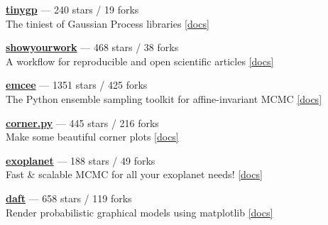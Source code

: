 \item \href{https://github.com/dfm/tinygp}{{\bf tinygp}} --- 240 stars / 19 forks \\
The tiniest of Gaussian Process libraries \href{https://tinygp.readthedocs.io}{[docs]}

\item \href{https://github.com/showyourwork/showyourwork}{{\bf showyourwork}} --- 468 stars / 38 forks \\
A workflow for reproducible and open scientific articles \href{https://show-your.work}{[docs]}

\item \href{https://github.com/dfm/emcee}{{\bf emcee}} --- 1351 stars / 425 forks \\
The Python ensemble sampling toolkit for affine-invariant MCMC \href{https://emcee.readthedocs.io}{[docs]}

\item \href{https://github.com/dfm/corner.py}{{\bf corner.py}} --- 445 stars / 216 forks \\
Make some beautiful corner plots \href{http://corner.readthedocs.io}{[docs]}

\item \href{https://github.com/exoplanet-dev/exoplanet}{{\bf exoplanet}} --- 188 stars / 49 forks \\
Fast {\&} scalable MCMC for all your exoplanet needs!  \href{https://docs.exoplanet.codes}{[docs]}

\item \href{https://github.com/daft-dev/daft}{{\bf daft}} --- 658 stars / 119 forks \\
Render probabilistic graphical models using matplotlib \href{https://docs.daft-pgm.org}{[docs]}
